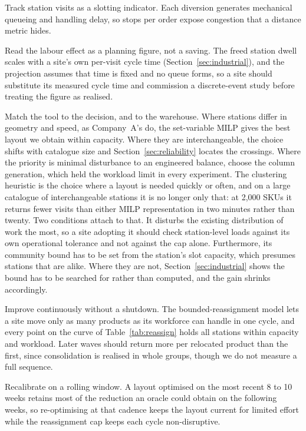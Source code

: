 \documentclass[]{interact}
\begin{document}
Track station visits as a slotting indicator. Each diversion generates mechanical queueing and handling delay, so stops per order expose congestion that a distance metric hides.

Read the labour effect as a planning figure, not a saving. The freed station dwell scales with a site's own per-visit cycle time (Section~\ref{sec:industrial}), and the projection assumes that time is fixed and no queue forms, so a site should substitute its measured cycle time and commission a discrete-event study before treating the figure as realised.

Match the tool to the decision, and to the warehouse. Where stations differ in geometry and speed, as Company~A's do, the set-variable MILP gives the best layout we obtain within capacity. Where they are interchangeable, the choice shifts with catalogue size and Section~\ref{sec:reliability} locates the crossings. Where the priority is minimal disturbance to an engineered balance, choose the column generation, which held the workload limit in every experiment. The clustering heuristic is the choice where a layout is needed quickly or often, and on a large catalogue of interchangeable stations it is no longer only that: at 2,000 SKUs it returns fewer visits than either MILP representation in two minutes rather than twenty. Two conditions attach to that. It disturbs the existing distribution of work the most, so a site adopting it should check station-level loads against its own operational tolerance and not against the cap alone. Furthermore, its community bound has to be set from the station's slot capacity, which presumes stations that are alike. Where they are not, Section~\ref{sec:industrial} shows the bound has to be searched for rather than computed, and the gain shrinks accordingly.

Improve continuously without a shutdown. The bounded-reassignment model lets a site move only as many products as its workforce can handle in one cycle, and every point on the curve of Table~\ref{tab:reassign} holds all stations within capacity and workload. Later waves should return more per relocated product than the first, since consolidation is realised in whole groups, though we do not measure a full sequence.

Recalibrate on a rolling window. A layout optimised on the most recent 8 to 10 weeks retains most of the reduction an oracle could obtain on the following weeks, so re-optimising at that cadence keeps the layout current for limited effort while the reassignment cap keeps each cycle non-disruptive.
\end{document}
